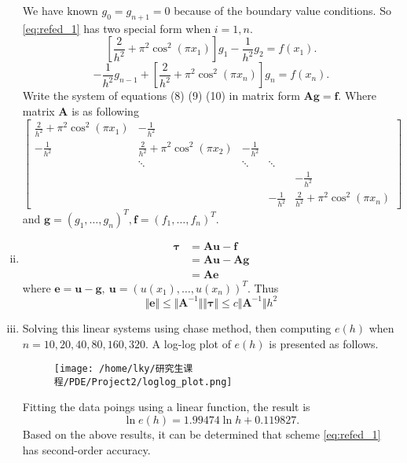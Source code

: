 \documentclass{ctexart}
\begin{document}
\begin{enumerate}[i)]
		We have known $g_0 = g_{n+1} = 0$ because of the boundary value conditions. So \eqref{eq:refed_1} has two special form when $i = 1, n$.
			\begin{equation}
				\left[\frac{2}{h^2} + \pi^2\cos^2(\pi x_1) \right]g_1 - \frac{1}{h^2}g_{2} = f(x_1). \label{eq:refed_2}
			\end{equation}
			\begin{equation}
				-\frac{1}{h^2}g_{n-1} + \left[\frac{2}{h^2} + \pi^2\cos^2(\pi x_n) \right]g_n= f(x_n). \label{eq:refed_2}
			\end{equation}
		Write the system of equations (8) (9) (10) in matrix form $\boldsymbol{A}\boldsymbol{g} = \boldsymbol{f}$. Where matrix $\boldsymbol{A}$ is as following 
			\begin{equation*}
				\begin{bmatrix}
					\frac{2}{h^2} + \pi^2\cos^2(\pi x_1) & -\frac{1}{h^2} &  &  &  \\
					-\frac{1}{h^2} & \frac{2}{h^2} + \pi^2\cos^2(\pi x_2) & -\frac{1}{h^2} & & \\
					 & \ddots & \ddots & \ddots &  \\
					& &  &  &  -\frac{1}{h^2} \\
					 & &  & -\frac{1}{h^2} & \frac{2}{h^2} + \pi^2\cos^2(\pi x_n)
				\end{bmatrix}
			\end{equation*}
		and $\boldsymbol{g}=(g_1, \dots, g_n)^T, \boldsymbol{f}=(f_1, \dots, f_n)^T$.
	\item 
		\begin{equation*}
			\begin{aligned}
				\boldsymbol{\tau} &= \boldsymbol{A} \boldsymbol{u} - \boldsymbol{f} \\
				&= \boldsymbol{A} \boldsymbol{u} - \boldsymbol{A} \boldsymbol{g} \\
				&= \boldsymbol{A} \boldsymbol{e}
			\end{aligned}
		\end{equation*}
	where $\boldsymbol{e} = \boldsymbol{u} - \boldsymbol{g}, ~ \boldsymbol{u} = (u(x_1), \dots, u(x_n))^T$.
	Thus 
		\begin{equation*}
			\Vert \boldsymbol{e} \Vert \leqslant \Vert \boldsymbol{A}^{-1} \Vert \Vert \boldsymbol{\tau} \Vert \leqslant c \Vert \boldsymbol{A}^{-1} \Vert h^2
		\end{equation*}
	\item Solving this linear systems using chase method, then computing $e(h)$ when $n=10, 20, 40, 80, 160, 320$. A log-log plot of $e(h)$ is presented as follows.
		\begin{figure}[H]
			\centering
			\texttt{[image: /home/lky/研究生课程/PDE/Project2/loglog\_plot.png]}
			\label{fig.1}
		\end{figure}
	
	Fitting the data poings using a linear function, the result is
			\begin{equation*}
				\ln e(h) = 1.99474\ln h + 0.119827.
			\end{equation*}
	Based on the above results, it can be determined that scheme \eqref{eq:refed_1} has second-order accuracy.
\end{enumerate}
\end{document}
